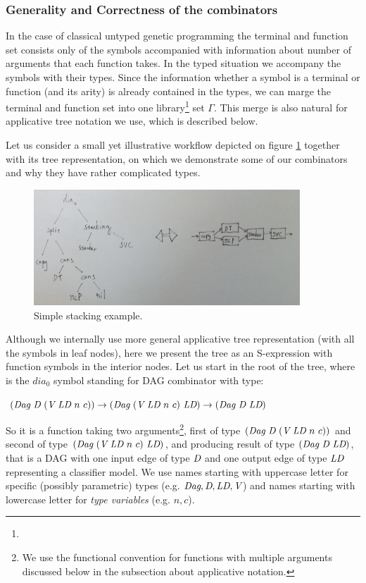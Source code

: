 \documentclass{ws-ijait}
\begin{document}
\subsubsection{Generality and Correctness of the combinators}

In the case of classical untyped genetic programming the terminal and function set consists only of the symbols accompanied with information about number of arguments that each function takes. In the typed situation we accompany the symbols with their types. Since the information whether a symbol is a terminal or function (and its arity) is already contained in the types, we can marge the terminal and function set into one library\footnote{} set $\Gamma$. This merge is also natural for applicative tree notation we use, which is described below.  

Let us consider a small yet illustrative workflow depicted on figure \ref{simple_stacking} together with its tree representation, on which we demonstrate some of our combinators and why they have rather complicated types.

\begin{figure}[th]
\centerline{\includegraphics[width=10cm]{simple_stacking.jpg}}
\vspace*{8pt}
\caption{Simple stacking example.}
\label{simple_stacking}
\end{figure}

Although we internally use more general applicative tree representation (with all the symbols in leaf nodes),
here we present the tree as an S-expression with function symbols in the interior nodes.
Let us start in the root of the tree, where is the $dia_0$ symbol standing for DAG combinator with type:
 
$(\textit{Dag}\ \textit{D}\ (\textit{V}\ \textit{LD}\ n\ c)) \rightarrow (\textit{Dag}\ (\textit{V}\ \textit{LD}\ n\ c)\ \textit{LD}) \rightarrow (\textit{Dag}\ \textit{D}\ \textit{LD})$
  
So it is a function taking two arguments\footnote{We use the functional convention for functions with multiple arguments discussed below in the subsection about applicative notation.}, 
first of type $(\textit{Dag}\ \textit{D}\ (\textit{V}\ \textit{LD}\ n\ c))$ and second of type $(\textit{Dag}\ (\textit{V}\ \textit{LD}\ n\ c)\ \textit{LD})$, 
and producing result of type $(\textit{Dag}\ \textit{D}\ \textit{LD})$, that is a DAG with one input edge of type $\textit{D}$ and one output edge of type $\textit{LD}$ representing a classifier model.
We use names starting with uppercase letter for specific (possibly parametric) types (e.g. $\textit{Dag}, \textit{D}, \textit{LD}, \textit{V}$) 
and names starting with lowercase letter for \textit{type variables} (e.g. $n, c$).
\end{document}
